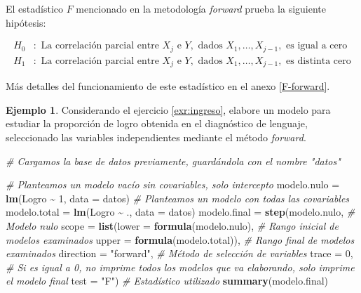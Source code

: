 \documentclass[
  11pt,
]{book}
\newenvironment{Shaded}{\begin{snugshade}}{\end{snugshade}}
\newcommand{\AttributeTok}[1]{\textcolor[rgb]{0.13,0.29,0.53}{#1}}
\newcommand{\CommentTok}[1]{\textcolor[rgb]{0.56,0.35,0.01}{\textit{#1}}}
\newcommand{\DecValTok}[1]{\textcolor[rgb]{0.00,0.00,0.81}{#1}}
\newcommand{\FunctionTok}[1]{\textcolor[rgb]{0.13,0.29,0.53}{\textbf{#1}}}
\newcommand{\NormalTok}[1]{#1}
\newcommand{\OtherTok}[1]{\textcolor[rgb]{0.56,0.35,0.01}{#1}}
\newcommand{\SpecialCharTok}[1]{\textcolor[rgb]{0.81,0.36,0.00}{\textbf{#1}}}
\newcommand{\StringTok}[1]{\textcolor[rgb]{0.31,0.60,0.02}{#1}}
\theoremstyle{definition}
\theoremstyle{definition}
\newtheorem{example}{Ejemplo}[chapter]
\theoremstyle{definition}
\theoremstyle{definition}
\theoremstyle{remark}
\begin{document}
El estadístico \(F\) mencionado en la metodología \emph{forward} prueba la siguiente hipótesis:

\begin{equation}
\begin{split}
H_0 &: \text{ La correlación parcial entre } X_j \text{ e } Y, \text{ dados } X_1, \ldots , X_{j-1}, \text{ es igual a cero}\\
H_1 &: \text{ La correlación parcial entre } X_j \text{ e } Y, \text{ dados } X_1, \ldots , X_{j-1}, \text{ es distinta cero}
\end{split}
\label{eq:forward}
\end{equation}

Más detalles del funcionamiento de este estadístico en el anexo \ref{F-forward}.

\begin{example}
\protect\hypertarget{exm:forward1}{}\label{exm:forward1}Considerando el ejercicio \ref{exr:ingreso}, elabore un modelo para estudiar la proporción de logro obtenida en el diagnóstico de lenguaje, seleccionado las variables independientes mediante el método \emph{forward}.

\begin{Shaded}
\begin{Highlighting}[]
\CommentTok{\# Cargamos la base de datos previamente, guardándola con el nombre "datos"}

\CommentTok{\# Planteamos un modelo vacío sin covariables, solo intercepto}
\NormalTok{modelo.nulo }\OtherTok{=} \FunctionTok{lm}\NormalTok{(Logro }\SpecialCharTok{\textasciitilde{}} \DecValTok{1}\NormalTok{, }\AttributeTok{data =}\NormalTok{ datos)}
\CommentTok{\# Planteamos un modelo con todas las covariables}
\NormalTok{modelo.total }\OtherTok{=} \FunctionTok{lm}\NormalTok{(Logro }\SpecialCharTok{\textasciitilde{}}\NormalTok{ ., }\AttributeTok{data =}\NormalTok{ datos)}
\NormalTok{modelo.final }\OtherTok{=} \FunctionTok{step}\NormalTok{(modelo.nulo, }\CommentTok{\# Modelo nulo}
                    \AttributeTok{scope =} \FunctionTok{list}\NormalTok{(}\AttributeTok{lower =} \FunctionTok{formula}\NormalTok{(modelo.nulo), }\CommentTok{\# Rango inicial de modelos examinados}
                                 \AttributeTok{upper =} \FunctionTok{formula}\NormalTok{(modelo.total)), }\CommentTok{\# Rango final de modelos examinados}
                    \AttributeTok{direction =} \StringTok{"forward"}\NormalTok{, }\CommentTok{\# Método de selección de variables}
                    \AttributeTok{trace =} \DecValTok{0}\NormalTok{, }\CommentTok{\# Si es igual a 0, no imprime todos los modelos que va elaborando, solo imprime el modelo final}
                    \AttributeTok{test =} \StringTok{"F"}\NormalTok{) }\CommentTok{\# Estadístico utilizado}
\FunctionTok{summary}\NormalTok{(modelo.final)}
\end{Highlighting}
\end{Shaded}


\end{example}
\end{document}
